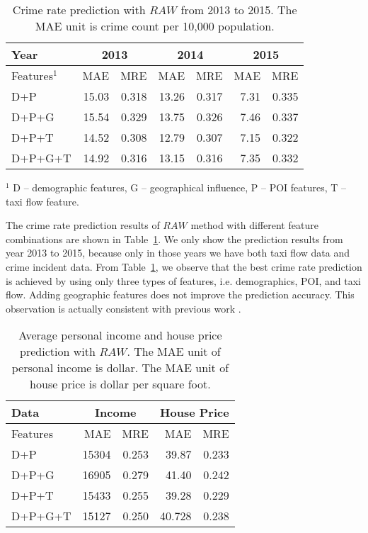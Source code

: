 \begin{table}[h]
\vspace{-2mm}
\centering
\caption{Crime rate prediction with $RAW$ from 2013 to 2015. The MAE unit is crime count per 10,000 population.}
\vspace{-3mm}
\label{exp:crime}
\begin{tabular}{|l|r|r|r|r|r|r|}
\hline
Year & \multicolumn{2}{c|}{2013} & \multicolumn{2}{c|}{2014} &  \multicolumn{2}{c|}{2015} \\ \hline
Features$^1$ & MAE & MRE & MAE & MRE & MAE & MRE \\ \hline
D+P	& 15.03	& 0.318	& 13.26 & 0.317	& 7.31	& 0.335 \\ \hline
D+P+G &	15.54	& 0.329	& 13.75	& 0.326	 & 7.46	& 0.337\\ \hline
\rowcolor{Gray}
D+P+T &	14.52	&0.308	&12.79	&0.307	&7.15	&0.322 \\ \hline
D+P+G+T &	14.92	&0.316	&13.15	&0.316	&7.35	&0.332\\ \hline
\end{tabular}

\footnotesize{$^1$ D -- demographic features, G -- geographical influence, P -- POI features, T -- taxi flow feature.\\}
\vspace{-2mm}
\end{table}

The crime rate prediction results of $RAW$ method with different feature combinations are shown in Table~\ref{exp:crime}. We only show the prediction results from year 2013 to 2015, because only in those years we have both taxi flow data and crime incident data. From Table~\ref{exp:crime}, we observe that the best crime rate prediction is achieved by using only three types of features, i.e. demographics, POI, and taxi flow. Adding geographic features does not improve the prediction accuracy. This observation is actually consistent with previous work \cite{wang2016crime}. 


\begin{table}[h]
\centering
\caption{Average personal income and house price prediction with $RAW$. The MAE unit of personal income is dollar. The MAE unit of house price is dollar per square foot.}
\vspace{-3mm}
\label{exp:other}
\begin{tabular}{|l|r|r|r|r|}
\hline
Data & \multicolumn{2}{c|}{Income} & \multicolumn{2}{c|}{House Price}  \\ \hline
Features & MAE & MRE & MAE & MRE  \\ \hline
D+P	& 15304 &	0.253 & 39.87 & 0.233 \\ \hline
D+P+G &	16905 &	0.279 & 41.40 & 0.242 \\ \hline
D+P+T &	15433 &	0.255 & \cellcolor{Gray} 39.28 & \cellcolor{Gray} 0.229  \\ \hline
D+P+G+T & \cellcolor{Gray}	15127 & \cellcolor{Gray} 0.250 & 40.728 & 0.238 \\ \hline
\end{tabular}
\end{table}


